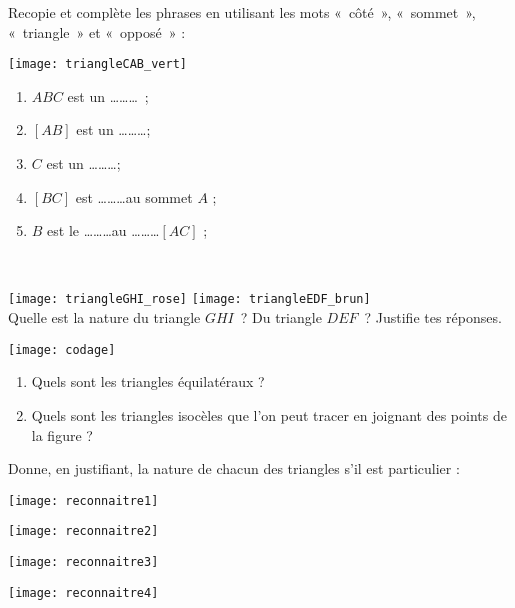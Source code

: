 

\begin{exercice}
Recopie et complète les phrases en utilisant les mots « côté », « sommet », « triangle » et « opposé » : \\[-3em]
\begin{minipage}[c]{0.26\linewidth}
 \vspace{1.5cm}
 \texttt{[image: triangleCAB\_vert]}
 \end{minipage} \hfill%
 \begin{minipage}[t]{0.68\linewidth}
  \begin{enumerate}
   \item $ABC$ est un \ldots \ldots \ldots ;
   \item $[AB]$ est un  \ldots \ldots\ldots ;
   \item $C$ est un  \ldots \ldots\ldots ;
   \item $[BC]$ est  \ldots \ldots \ldots au sommet $A$ ;
   \item $B$ est le  \ldots \ldots \ldots au  \ldots \ldots \ldots $[AC]$ ;
   \end{enumerate}
 \end{minipage} \\
\end{exercice}


\begin{exercice}
 \hfill \texttt{[image: triangleGHI\_rose]} \hfill  \texttt{[image: triangleEDF\_brun]} \hfill \\[1em]
 Quelle est la nature du triangle $GHI$ ? Du triangle $DEF$ ? Justifie tes réponses.
\end{exercice}

\begin{exercice}
\begin{center} \texttt{[image: codage]} \end{center}
\begin{enumerate}
 \item Quels sont les triangles équilatéraux ?
 \item Quels sont les triangles isocèles que l'on peut tracer en joignant des points de la figure ?
 \end{enumerate}
\end{exercice}

\begin{exercice}[Reconnaître]
Donne, en justifiant, la nature de chacun des triangles s'il est particulier :
\begin{colenumerate}{4}
 \item 
 
 \texttt{[image: reconnaitre1]}
 \item 
 
 \texttt{[image: reconnaitre2]}
 \item 
 
 \texttt{[image: reconnaitre3]}
 \item 
 
 \texttt{[image: reconnaitre4]}
 \end{colenumerate}
\end{exercice}


